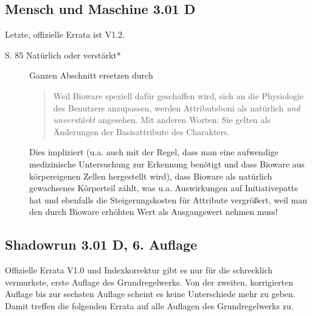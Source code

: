 \documentclass[a4paper]{scrartcl}
\newcommand{\errata}[1]{Letzte, offizielle Errata ist V#1.}
\begin{document}
\subsection{Mensch und Maschine 3.01 D}
\errata{1.2}
\begin{description}
 \item[S. 85 Natürlich oder verstärkt*] Ganzen Abschnitt ersetzen durch
 \begin{quote}
  \glqq Weil Bioware speziell dafür geschaffen wird, sich an die Physiologie des Benutzers anzupassen, werden Attributsboni als natürlich \textit{und unverstärkt} angesehen. Mit anderen Worten: Sie gelten als Änderungen der Basisattribute des Charakters.\grqq
 \end{quote}
 Dies impliziert (u.a. auch mit der Regel, dass man eine aufwendige medizinische Untersuchung zur Erkennung benötigt und dass Bioware aus körpereigenen Zellen hergestellt wird), dass Bioware als natürlich gewachsenes Körperteil zählt, was u.a. Auswirkungen auf Initiativepatts hat und ebenfalls die Steigerungskosten für Attribute vergrößert, weil man den durch Bioware erhöhten Wert als Ausgangswert nehmen muss!
\end{description}

\subsection{Shadowrun 3.01 D, 6. Auflage}
Offizielle Errata V1.0 und Indexkorrektur gibt es nur für die schrecklich vermurkste, erste Auflage des Grundregelwerks. Von der zweiten, korrigierten Auflage bis zur sechsten Auflage scheint es keine Unterschiede mehr zu geben.
Damit treffen die folgenden Errata auf alle Auflagen des Grundregelwerks zu.
\end{document}
